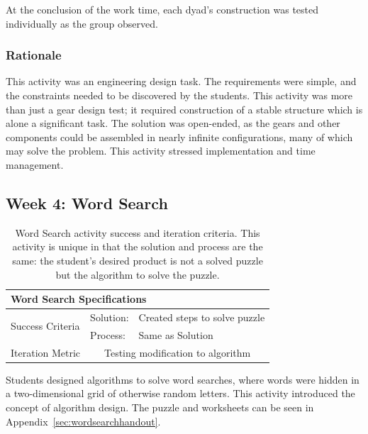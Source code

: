 	At the conclusion of the work time, each dyad's construction was tested individually as the group observed.
	
	
	\subsubsection{Rationale}
	
	This activity was an engineering design task. The requirements were simple,
	and the constraints needed to be discovered by the students. This activity was more than just a gear design test; it required construction of a stable structure which is alone a significant task. The solution was open-ended, as the gears and other components could be assembled in nearly infinite configurations, many of which may solve the problem. This activity stressed implementation and time management. 

\subsection{Week 4: Word Search}

	\begin{table}
	\begin{centering}
	\begin{tabular}{l  l   l}
		\multicolumn{3}{l}{{\large Word Search Specifications}} \\
		\toprule
		\multirow{2}{*}{Success Criteria}  
			& Solution: 		& Created steps to solve puzzle \\ \cmidrule(r){2-3}
			& Process:		& Same as Solution \\ \midrule
		Iteration Metric	 & \multicolumn{2}{c}{Testing modification to algorithm }\\ 
		\bottomrule
	\end{tabular}
	\caption[Word Search activity success and iteration criteria.]{Word Search activity success and iteration criteria. This activity is unique in that the solution and process are the same: the student's desired product is not a solved puzzle but the algorithm to solve the puzzle.}
	\label{tab:spec-word-search}
	\end{centering}
	\end{table}
	
	Students designed algorithms to solve word searches, where words
	were hidden in a two-dimensional grid of otherwise random letters.
	This activity introduced the concept of algorithm design. The puzzle and worksheets can be seen in Appendix~\ref{sec:wordsearchhandout}.
	
